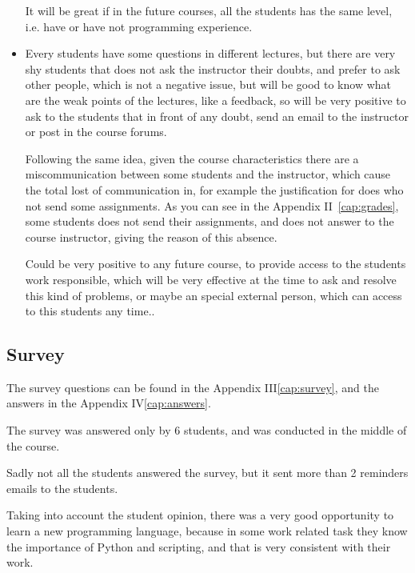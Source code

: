 \documentclass[letter, 10pt]{article}
\begin{document}
\begin{itemize}
          It will be great if in the future courses, all the students
          has the same level, i.e. have or have not programming experience.

    \item Every students have some questions in different lectures,
          but there are very shy students that does not ask the instructor
          their doubts, and prefer to ask other people, which is not
          a negative issue, but will be good to know what are the weak points
          of the lectures, like a feedback, so will be very positive to
          ask to the students that in front of any doubt, send an email
          to the instructor or post in the course forums.

          Following the same idea, given the course characteristics
          there are a miscommunication between some students and the instructor,
          which cause the total lost of communication in, for example
          the justification for does who not send some assignments.
          As you can see in the Appendix II~\ref{cap:grades},
          some students does not send their assignments,
          and does not answer to the course instructor,
          giving the reason of this absence.

          Could be very positive to any future course,
          to provide access to the students work responsible,
          which will be very effective at the time to ask
          and resolve this kind of problems,
          or maybe an special external person,
          which can access to this students any time..
\end{itemize}

\subsection{Survey}

The survey questions can be found in the Appendix III\ref{cap:survey},
and the answers in the Appendix IV\ref{cap:answers}.

The survey was answered only by 6 students,
and was conducted in the middle of the course. 

Sadly not all the students answered the survey,
but it sent more than 2 reminders emails to the students.

Taking into account the student opinion,
there was a very good opportunity to learn a new programming language,
because in some work related task they know the importance of Python and scripting,
and that is very consistent with their work.
\end{document}
